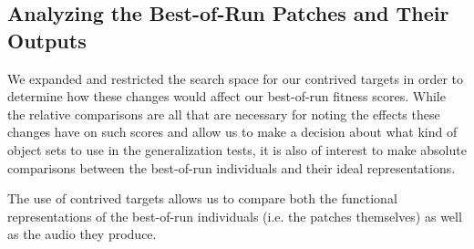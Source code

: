 \documentclass[a4paper,12pt]{report} 	%
\numberwithin{figure}{chapter}
\numberwithin{table}{chapter}
\numberwithin{equation}{chapter}
\begin{document}
\begin{flushleft}
\subsection{Analyzing the Best-of-Run Patches and Their Outputs}
We expanded and restricted the search space for our contrived targets in order to determine how these changes would affect our best-of-run fitness scores. While the relative comparisons are all that are necessary for noting the effects these changes have on such scores and allow us to make a decision about what kind of object sets to use in the generalization tests, it is also of interest to make absolute comparisons between the best-of-run individuals and their ideal representations. 

The use of contrived targets allows us to compare both the functional representations of the best-of-run individuals (i.e. the patches themselves) as well as the audio they produce.


\end{flushleft}
\end{document}
